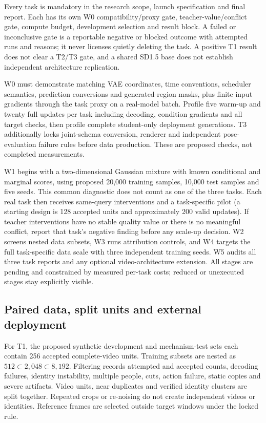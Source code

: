 \documentclass[11pt]{article}
\begin{document}
Every task is mandatory in the research scope, launch specification and final report. Each has its own W0 compatibility/proxy gate, teacher-value/conflict gate, compute budget, development selection and result block. A failed or inconclusive gate is a reportable negative or blocked outcome with attempted runs and reasons; it never licenses quietly deleting the task. A positive T1 result does not clear a T2/T3 gate, and a shared SD1.5 base does not establish independent architecture replication.

W0 must demonstrate matching VAE coordinates, time conventions, scheduler semantics, prediction conversions and generated-region masks, plus finite input gradients through the task proxy on a real-model batch. Profile five warm-up and twenty full updates per task including decoding, condition gradients and all target checks, then profile complete student-only deployment generations. T3 additionally locks joint-schema conversion, renderer and independent pose-evaluation failure rules before data production. These are proposed checks, not completed measurements.

W1 begins with a two-dimensional Gaussian mixture with known conditional and marginal scores, using proposed 20,000 training samples, 10,000 test samples and five seeds. This common diagnostic does not count as one of the three tasks. Each real task then receives same-query interventions and a task-specific pilot (a starting design is 128 accepted units and approximately 200 valid updates). If teacher interventions have no stable quality value or there is no meaningful conflict, report that task's negative finding before any scale-up decision. W2 screens nested data subsets, W3 runs attribution controls, and W4 targets the full task-specific data scale with three independent training seeds. W5 audits all three task reports and any optional video-architecture extension. All stages are pending and constrained by measured per-task costs; reduced or unexecuted stages stay explicitly visible.

\subsection{Paired data, split units and external deployment}
For T1, the proposed synthetic development and mechanism-test sets each contain 256 accepted complete-video units. Training subsets are nested as $512\subset2{,}048\subset8{,}192$. Filtering records attempted and accepted counts, decoding failures, identity instability, multiple people, cuts, action failure, static copies and severe artifacts. Video units, near duplicates and verified identity clusters are split together. Repeated crops or re-noising do not create independent videos or identities. Reference frames are selected outside target windows under the locked rule.
\end{document}
